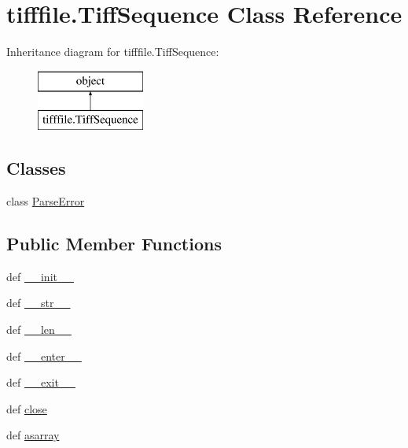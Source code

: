 \hypertarget{classtifffile_1_1_tiff_sequence}{\section{tifffile.\-Tiff\-Sequence Class Reference}
\label{classtifffile_1_1_tiff_sequence}
}
Inheritance diagram for tifffile.\-Tiff\-Sequence\-:\begin{figure}[H]
\begin{center}
\leavevmode
\includegraphics[height=2.000000cm]{classtifffile_1_1_tiff_sequence}
\end{center}
\end{figure}
\subsection*{Classes}
\begin{DoxyCompactItemize}
\item 
class \hyperlink{classtifffile_1_1_tiff_sequence_1_1_parse_error}{Parse\-Error}
\end{DoxyCompactItemize}
\subsection*{Public Member Functions}
\begin{DoxyCompactItemize}
\item 
def \hyperlink{classtifffile_1_1_tiff_sequence_ad2a937998bb0fbb469fd45af3c5b9ee4}{\-\_\-\-\_\-init\-\_\-\-\_\-}
\item 
def \hyperlink{classtifffile_1_1_tiff_sequence_ab271e42b6b0a2d34069c16813b3c6396}{\-\_\-\-\_\-str\-\_\-\-\_\-}
\item 
def \hyperlink{classtifffile_1_1_tiff_sequence_a1e84248e6ff24c50927c27ea3387ae20}{\-\_\-\-\_\-len\-\_\-\-\_\-}
\item 
def \hyperlink{classtifffile_1_1_tiff_sequence_a22f8614649ba8ee39f28db15de453406}{\-\_\-\-\_\-enter\-\_\-\-\_\-}
\item 
def \hyperlink{classtifffile_1_1_tiff_sequence_a5af53397d4d20dc45a6afeafb7798103}{\-\_\-\-\_\-exit\-\_\-\-\_\-}
\item 
def \hyperlink{classtifffile_1_1_tiff_sequence_a66ea3eced1f21205b7fbc4632b7cf41a}{close}
\item 
def \hyperlink{classtifffile_1_1_tiff_sequence_a881cfef0cf4ae0deb1a3fd40b57ff38a}{asarray}
\end{DoxyCompactItemize}
